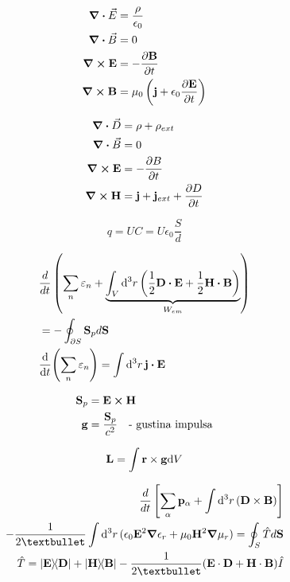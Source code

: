 \documentclass[11pt,twoside]{article}
\begin{document}
\begin{multicols}{3}
\begin{footnotesize}
\begin{equation}
\begin{split}
\div\vec{E} &= \frac{\rho}{\epsilon_0} \\
\div\vec{B} &= 0 \\
\curl \vb{E} &= -\frac{\partial\vb{B}}{\partial t} \\
\curl \vb{B} &= \mu_0 \left( \vb{j} + \epsilon_0 \frac{\partial\vb{E}}{\partial t} \right)
\end{split}
\end{equation}

\begin{equation}
\begin{split}
\div\vec{D} &= \rho + \rho_{ext} \\
\div\vec{B} &= 0 \\
\curl \vb{E} &= - \frac{\partial B}{\partial t} \\
\curl \vb{H} &= \vb{j} + \vb{j}_{ext} + \frac{\partial D}{\partial t}
\end{split}
\end{equation}

\begin{equation}
q = U C = U \epsilon_0 \frac{S}{d}
\end{equation}

\begin{equation}
\begin{split}
&\frac{d}{dt} \left( \sum_n \varepsilon_n + \underbrace{\int_V \dd[3]{r} \left( \frac{1}{2} \vb{D}\vdot\vb{E} + \frac{1}{2}\vb{H}\vdot\vb{B} \right)}_{W_{em}} \right) \\ &= -\oint_{\partial S} \vb{S}_p d\vb{S} \\
&\dv{t} (\sum_n \varepsilon_n ) = \int \dd[3]{r}\vb{j}\vdot\vb{E}
\end{split}
\end{equation}

\begin{equation}
\begin{split}
\vb{S}_p &= \vb{E}\cross\vb{H} \\
\vb{g} &= \frac{\vb{S}_p}{c^2} \quad \text{- gustina impulsa}
\end{split}
\end{equation}

\begin{equation}
\vb{L} = \int \vb{r} \times \vb{g} \dd V
\end{equation}

\begin{equation}
\begin{split}
\frac{d}{dt}\left[\sum_{\alpha} \vb{p}_{\alpha} + \int \dd[3]{r} (\vb{D} \times \vb{B}) \right] \\ - \frac{1}{2•}\int \dd[3]{r}(\epsilon_0 \vb{E}^2 \gradient \epsilon_r + \mu_0\vb{H}^2 \gradient \mu_r) = \oint_S \hat{T}d\vb{S} \\
\hat{T} = \dyad{\vb{E}}{\vb{D}} + \dyad{\vb{H}}{\vb{B}} - \frac{1}{2•}(\vb{E}\cdot\vb{D}+\vb{H}\cdot\vb{B})\hat{I}
\end{split}
\end{equation}


\end{footnotesize}
\end{multicols}
\end{document}
